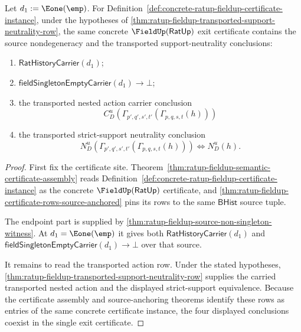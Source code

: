 \begin{theorem}
\label{thm:ratup-fieldup-exit-transported-support-nondegenerate}
Let $d_1:=\Eone(\emp)$. For
Definition~\ref{def:concrete-ratup-fieldup-certificate-instance}, under the
hypotheses of
\autoref{thm:ratup-fieldup-transported-support-neutrality-row}, the same
concrete $\FieldUp(\mathsf{RatUp})$ exit certificate contains the source
nondegeneracy and the transported support-neutrality conclusions:
\begin{enumerate}
  \item $\mathsf{RatHistoryCarrier}(d_1)$;
  \item $\mathsf{fieldSingletonEmptyCarrier}(d_1)\to\bot$;
  \item the transported nested action carrier conclusion
  $$
  C_D^u(\Gamma_{p',q',s',t'}(\Gamma_{p,q,s,t}(h)))
  $$
  \item the transported strict-support neutrality conclusion
  $$
  N_D^u(\Gamma_{p',q',s',t'}(\Gamma_{p,q,s,t}(h)))
  \Longleftrightarrow N_D^u(h).
  $$
\end{enumerate}
\end{theorem}
\begin{proof}
First fix the certificate site. Theorem~\ref{thm:ratup-fieldup-semantic-certificate-assembly}
reads Definition~\ref{def:concrete-ratup-fieldup-certificate-instance} as the
concrete $\FieldUp(\mathsf{RatUp})$ certificate, and
\autoref{thm:ratup-fieldup-certificate-rows-source-anchored} pins its rows to
the same $\mathsf{BHist}$ source tuple.

The endpoint part is supplied by
\autoref{thm:ratup-fieldup-source-non-singleton-witness}. At
$d_1=\Eone(\emp)$ it gives both
$\mathsf{RatHistoryCarrier}(d_1)$ and
$\mathsf{fieldSingletonEmptyCarrier}(d_1)\to\bot$ over that source.

It remains to read the transported action row. Under the stated hypotheses,
\autoref{thm:ratup-fieldup-transported-support-neutrality-row} supplies the
carried transported nested action and the displayed strict-support equivalence.
Because the certificate assembly and source-anchoring theorems identify these
rows as entries of the same concrete certificate instance, the four displayed
conclusions coexist in the single exit certificate.
\end{proof}

